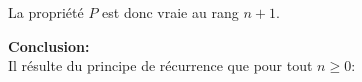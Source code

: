 \begin{correction}
\begin{enumerate}
La propriété $P$ est donc vraie au rang $n+1$.

\textbf{Conclusion:}\\
Il r\'esulte du principe de r\'ecurrence que pour tout $ n\geq 0$:
\begin{center}
\end{center}





\end{enumerate}
\end{correction}